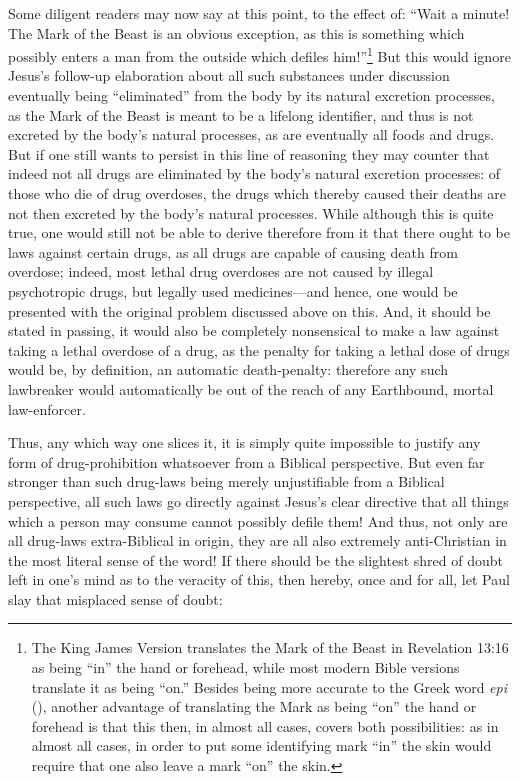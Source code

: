 \documentclass[letterpaper,12pt]{article}
\begin{document}
Some diligent readers may now say at this point, to the effect of: ``Wait a minute! The Mark of the Beast is an obvious exception, as this is something which possibly enters a man from the outside which defiles him!''\footnote{The King James Version translates the Mark of the Beast in Revelation 13:16 as being ``in'' the hand or forehead, while most modern Bible versions translate it as being ``on.'' Besides being more accurate to the Greek word \emph{epi} (), another advantage of translating the Mark as being ``on'' the hand or forehead is that this then, in almost all cases, covers both possibilities: as in almost all cases, in order to put some identifying mark ``in'' the skin would require that one also leave a mark ``on'' the skin.} But this would ignore Jesus's follow-up elaboration about all such substances under discussion eventually being ``eliminated'' from the body by its natural excretion processes, as the Mark of the Beast is meant to be a lifelong identifier, and thus is not excreted by the body's natural processes, as are eventually all foods and drugs. But if one still wants to persist in this line of reasoning they may counter that indeed not all drugs are eliminated by the body's natural excretion processes: of those who die of drug overdoses, the drugs which thereby caused their deaths are not then excreted by the body's natural processes. While although this is quite true, one would still not be able to derive therefore from it that there ought to be laws against certain drugs, as all drugs are capable of causing death from overdose; indeed, most lethal drug overdoses are not caused by illegal psychotropic drugs, but legally used medicines---and hence, one would be presented with the original problem discussed above on this. And, it should be stated in passing, it would also be completely nonsensical to make a law against taking a lethal overdose of a drug, as the penalty for taking a lethal dose of drugs would be, by definition, an automatic death-penalty: therefore any such lawbreaker would automatically be out of the reach of any Earthbound, mortal law-enforcer.

Thus, any which way one slices it, it is simply quite impossible to justify any form of drug-prohibition whatsoever from a Biblical perspective. But even far stronger than such drug-laws being merely unjustifiable from a Biblical perspective, all such laws go directly against Jesus's clear directive that all things which a person may consume cannot possibly defile them! And thus, not only are all drug-laws extra-Biblical in origin, they are all also extremely anti-Christian in the most literal sense of the word! If there should be the slightest shred of doubt left in one's mind as to the veracity of this, then hereby, once and for all, let Paul slay that misplaced sense of doubt:
\end{document}
